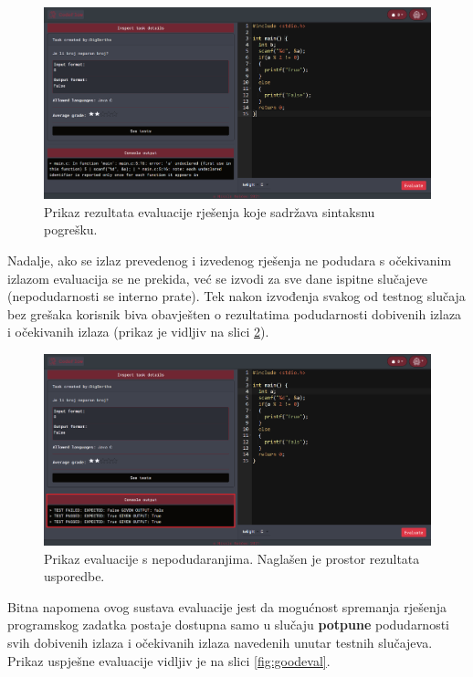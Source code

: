 \documentclass[times, utf8, zavrsni, numeric]{fer}
\begin{document}
	\begin{figure}[H]
		\centering
		\includegraphics[width=\linewidth]{pictures/evaluacija/error.png}
		\caption{Prikaz rezultata evaluacije rješenja koje sadržava sintaksnu pogrešku.}
		\label{fig:error}
	\end{figure}
	Nadalje, ako se izlaz prevedenog i izvedenog rješenja ne podudara s očekivanim izlazom evaluacija se ne prekida, već se izvodi za sve dane ispitne slučajeve (nepodudarnosti se interno prate). Tek nakon izvođenja svakog od testnog slučaja bez grešaka korisnik biva obavješten o rezultatima podudarnosti dobivenih izlaza i očekivanih izlaza (prikaz je vidljiv na slici \ref{fig:badeval}).
	\begin{figure}[H]
		\centering
		\includegraphics[width=\linewidth]{pictures/evaluacija/badeval.png}
		\caption{Prikaz evaluacije s nepodudaranjima. Naglašen je prostor rezultata usporedbe.}
		\label{fig:badeval}
	\end{figure} 
	Bitna napomena ovog sustava evaluacije jest da mogućnost spremanja rješenja programskog zadatka postaje dostupna samo u slučaju \textbf{potpune} podudarnosti svih dobivenih izlaza i očekivanih izlaza navedenih unutar testnih slučajeva. Prikaz uspješne evaluacije vidljiv je na slici \ref{fig:goodeval}. 
\end{document}
